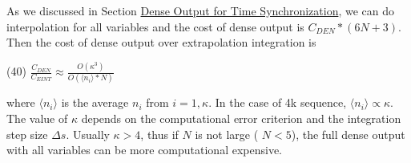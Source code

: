 As we discussed in Section \hyperlink{index_dense_sec}{Dense Output for Time Synchronization}, we can do interpolation for all variables and the cost of dense output is $ C_{DEN}*(6N+3) $. Then the cost of dense output over extrapolation integration is

(40) $ \frac{C_{DEN}}{C_{EINT}} \approx \frac{O(\kappa^3)}{O(\langle n_i\rangle*N)} $

where $\langle n_i\rangle$ is the average $ n_i $ from $ i=1,\kappa$. In the case of 4k sequence, $\langle n_i\rangle \propto \kappa$. The value of $\kappa$ depends on the computational error criterion and the integration step size $ \Delta s$. Usually $ \kappa>4 $, thus if $ N $ is not large ( $ N < 5 $), the full dense output with all variables can be more computational expensive. 
